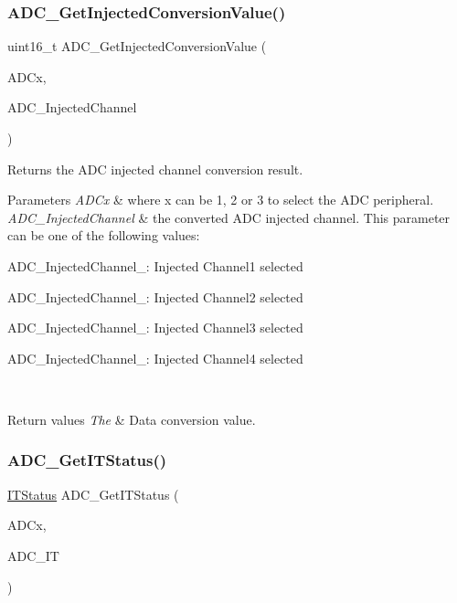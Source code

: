 \subsubsection{\texorpdfstring{ADC\_GetInjectedConversionValue()}{ADC\_GetInjectedConversionValue()}}
{\footnotesize\ttfamily uint16\+\_\+t A\+D\+C\+\_\+\+Get\+Injected\+Conversion\+Value (\begin{DoxyParamCaption}\item[{\mbox{\hyperlink{struct_a_d_c___type_def}{A\+D\+C\+\_\+\+Type\+Def}} $\ast$}]{A\+D\+Cx,  }\item[{uint8\+\_\+t}]{A\+D\+C\+\_\+\+Injected\+Channel }\end{DoxyParamCaption})}



Returns the A\+DC injected channel conversion result. 


\begin{DoxyParams}{Parameters}
{\em A\+D\+Cx} & where x can be 1, 2 or 3 to select the A\+DC peripheral. \\
\hline
{\em A\+D\+C\+\_\+\+Injected\+Channel} & the converted A\+DC injected channel. This parameter can be one of the following values\+: \begin{DoxyItemize}
\item A\+D\+C\+\_\+\+Injected\+Channel\+\_\+: Injected Channel1 selected \item A\+D\+C\+\_\+\+Injected\+Channel\+\_\+: Injected Channel2 selected \item A\+D\+C\+\_\+\+Injected\+Channel\+\_\+: Injected Channel3 selected \item A\+D\+C\+\_\+\+Injected\+Channel\+\_\+: Injected Channel4 selected \end{DoxyItemize}
\\
\hline
\end{DoxyParams}

\begin{DoxyRetVals}{Return values}
{\em The} & Data conversion value. \\
\hline
\end{DoxyRetVals}
\mbox{\label{group___a_d_c___exported___functions_gaa1d3b910a83dbf14d4f68c8eef058612}} 
\subsubsection{\texorpdfstring{ADC\_GetITStatus()}{ADC\_GetITStatus()}}
{\footnotesize\ttfamily \mbox{\hyperlink{group___exported__types_gaacbd7ed539db0aacd973a0f6eca34074}{I\+T\+Status}} A\+D\+C\+\_\+\+Get\+I\+T\+Status (\begin{DoxyParamCaption}\item[{\mbox{\hyperlink{struct_a_d_c___type_def}{A\+D\+C\+\_\+\+Type\+Def}} $\ast$}]{A\+D\+Cx,  }\item[{uint16\+\_\+t}]{A\+D\+C\+\_\+\+IT }\end{DoxyParamCaption})}



